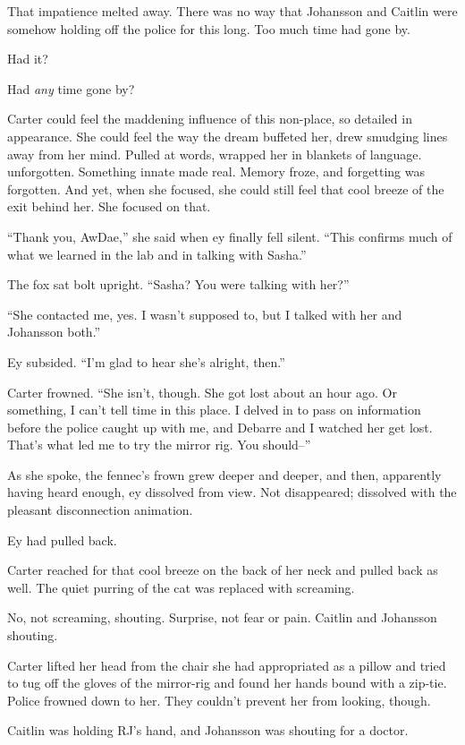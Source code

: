 That impatience melted away. There was no way that Johansson and Caitlin were somehow holding off the police for this long. Too much time had gone by.

Had it?

Had \emph{any} time gone by?

Carter could feel the maddening influence of this non-place, so detailed in appearance. She could feel the way the dream buffeted her, drew smudging lines away from her mind. Pulled at words, wrapped her in blankets of language. unforgotten. Something innate made real. Memory froze, and forgetting was forgotten. And yet, when she focused, she could still feel that cool breeze of the exit behind her. She focused on that.

``Thank you, AwDae,'' she said when ey finally fell silent. ``This confirms much of what we learned in the lab and in talking with Sasha.''

The fox sat bolt upright. ``Sasha? You were talking with her?''

``She contacted me, yes. I wasn't supposed to, but I talked with her and Johansson both.''

Ey subsided. ``I'm glad to hear she's alright, then.''

Carter frowned. ``She isn't, though. She got lost about an hour ago. Or something, I can't tell time in this place. I delved in to pass on information before the police caught up with me, and Debarre and I watched her get lost. That's what led me to try the mirror rig. You should--''

As she spoke, the fennec's frown grew deeper and deeper, and then, apparently having heard enough, ey dissolved from view. Not disappeared; dissolved with the pleasant disconnection animation.

Ey had pulled back.

Carter reached for that cool breeze on the back of her neck and pulled back as well. The quiet purring of the cat was replaced with screaming.

No, not screaming, shouting. Surprise, not fear or pain. Caitlin and Johansson shouting.

Carter lifted her head from the chair she had appropriated as a pillow and tried to tug off the gloves of the mirror-rig and found her hands bound with a zip-tie. Police frowned down to her. They couldn't prevent her from looking, though.

Caitlin was holding RJ's hand, and Johansson was shouting for a doctor.

